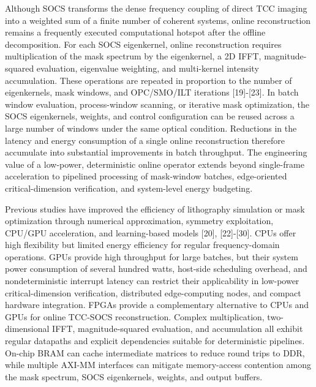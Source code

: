 \documentclass[
  preprint]{elsarticle}
\begin{document}
Although SOCS transforms the dense frequency coupling of direct TCC
imaging into a weighted sum of a finite number of coherent systems,
online reconstruction remains a frequently executed computational
hotspot after the offline decomposition. For each SOCS eigenkernel,
online reconstruction requires multiplication of the mask spectrum by
the eigenkernel, a 2D IFFT, magnitude-squared evaluation, eigenvalue
weighting, and multi-kernel intensity accumulation. These operations are
repeated in proportion to the number of eigenkernels, mask windows, and
OPC/SMO/ILT iterations {[}19{]}-{[}23{]}. In batch window evaluation,
process-window scanning, or iterative mask optimization, the SOCS
eigenkernels, weights, and control configuration can be reused across a
large number of windows under the same optical condition. Reductions in
the latency and energy consumption of a single online reconstruction
therefore accumulate into substantial improvements in batch throughput.
The engineering value of a low-power, deterministic online operator
extends beyond single-frame acceleration to pipelined processing of
mask-window batches, edge-oriented critical-dimension verification, and
system-level energy budgeting.

Previous studies have improved the efficiency of lithography simulation
or mask optimization through numerical approximation, symmetry
exploitation, CPU/GPU acceleration, and learning-based models {[}20{]},
{[}22{]}-{[}30{]}. CPUs offer high flexibility but limited energy
efficiency for regular frequency-domain operations. GPUs provide high
throughput for large batches, but their system power consumption of
several hundred watts, host-side scheduling overhead, and
nondeterministic interrupt latency can restrict their applicability in
low-power critical-dimension verification, distributed edge-computing
nodes, and compact hardware integration. FPGAs provide a complementary
alternative to CPUs and GPUs for online TCC-SOCS reconstruction. Complex
multiplication, two-dimensional IFFT, magnitude-squared evaluation, and
accumulation all exhibit regular datapaths and explicit dependencies
suitable for deterministic pipelines. On-chip BRAM can cache
intermediate matrices to reduce round trips to DDR, while multiple
AXI-MM interfaces can mitigate memory-access contention among the mask
spectrum, SOCS eigenkernels, weights, and output buffers.
\end{document}
